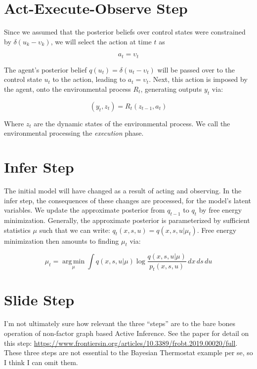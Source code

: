 \documentclass{article}
\begin{document}
\section{Act-Execute-Observe Step}

Since we assumed that the posterior beliefs over control states were constrained by $\delta(u_k - \upsilon_k)$, we will select the action at time $t$ as 

\begin{equation}\label{eq:5}
a_t = \upsilon_t
\end{equation}

The agent's posterior belief $q(u_t) = \delta(u_t - \upsilon_t)$ will be passed over to the control state $u_t$ to the action, leading to $a_t = \upsilon_t$. Next, this action is imposed by the agent, onto the environmental process $R_t$, generating outputs $y_t$ via: 

\begin{equation}\label{eq:6}
(y_t, z_t) = R_t(z_{t-1}, a_t)
\end{equation}

Where $z_t$ are the dynamic states of the environmental process. We call the environmental processing the \textit{execution} phase. 


\section{Infer Step}

The initial model will have changed as a result of acting and observing. In the infer step, the consequences of these changes are processed, for the model's latent variables. We update the approximate posterior from $q_{t-1}$ to $q_t$ by free energy minimization. Generally, the approximate posterior is parameterized by sufficient statistics $\mu$ such that we can write: $q_t(x, s, u) = q(x, s, u | \mu_t)$. Free energy minimization then amounts to finding $\mu_t$ via:

\begin{equation}\label{eq:7}
\mu_t = \operatorname*{arg\,min}_\mu \int q(x, s, u | \mu) \log{\frac{q(x, s, u | \mu)}{p_t(x, s, u)}}\,dx\,ds\,du
\end{equation}

\section{Slide Step}

I'm not ultimately sure how relevant the three ``steps'' are to the bare bones operation of non-factor graph based Active Inference. See the paper for detail on this step: \url{https://www.frontiersin.org/articles/10.3389/frobt.2019.00020/full}. These three steps are not essential to the Bayesian Thermostat example per se, so I think I can omit them.
\end{document}
